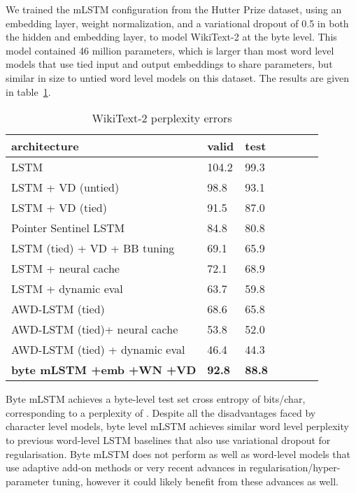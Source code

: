 \documentclass{article}
\begin{document}
We trained the mLSTM configuration from the Hutter Prize dataset, using an embedding layer, weight normalization, and a variational dropout of 0.5 in both the hidden and embedding layer, to model WikiText-2 at the byte level. This model contained 46 million parameters, which is larger than most word level models that use tied input and output embeddings \citep{press2017,inan2017} to share parameters, but similar in size to untied word level models on this dataset. The results are given in table~\ref{tab:wikitext}.
\begin{table}[h]
\begin{center} 
\begin{tabular}{  l  l  l  l  l  l  l } \toprule 
architecture &  valid & test  \\ 
\midrule 
LSTM   \citep{grave2017} & 104.2 & 99.3 \\
LSTM + VD (untied)\citep{inan2017} & 98.8 & 93.1 \\
LSTM + VD (tied)\citep{inan2017} & 91.5 & 87.0 \\
Pointer Sentinel LSTM \citep{Merity2016} & 84.8 & 80.8 \\
LSTM (tied) + VD + BB tuning \citep{melis2017} & 69.1 & 65.9 \\
LSTM + neural cache \citep{grave2017} & 72.1 & 68.9 \\
LSTM + dynamic eval \citep{krause2017} &  63.7 & 59.8\\
AWD-LSTM (tied) \citep{merity2017} & 68.6 & 65.8 \\
AWD-LSTM (tied)+ neural cache \citep{merity2017} & 53.8 & 52.0 \\
AWD-LSTM (tied) + dynamic eval \citep{krause2017} & 46.4 & 44.3 \\
\midrule 
\textbf{byte mLSTM +emb +WN +VD} & \textbf{92.8} & \textbf{88.8} \\
\bottomrule
\end{tabular} 
\end{center}
\caption{WikiText-2 perplexity errors}
\label{tab:wikitext}
\end{table}

Byte mLSTM achieves a byte-level test set cross entropy of  bits/char, corresponding to a perplexity of . Despite all the disadvantages faced by character level models, byte level mLSTM achieves similar word level perplexity to previous word-level LSTM baselines that also use variational dropout for regularisation. Byte mLSTM does not perform as well as word-level models that use adaptive add-on methods or very recent advances in regularisation/hyper-parameter tuning, however it could likely benefit from these advances as well. 
\end{document}
